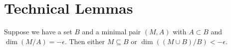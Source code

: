 \documentclass{amsart}
\begin{document}








%
%
%
%

\section{Technical Lemmas}

\begin{Lemma}
	Suppose we have a set $B$ and a minimal pair $(M, A)$ with $A \subset B$ and $\dim(M/A) = -\epsilon$.
Then either $M \subseteq B$ or $\dim((M \cup B)/B) < -\epsilon$.
\end{Lemma}
\end{document}
